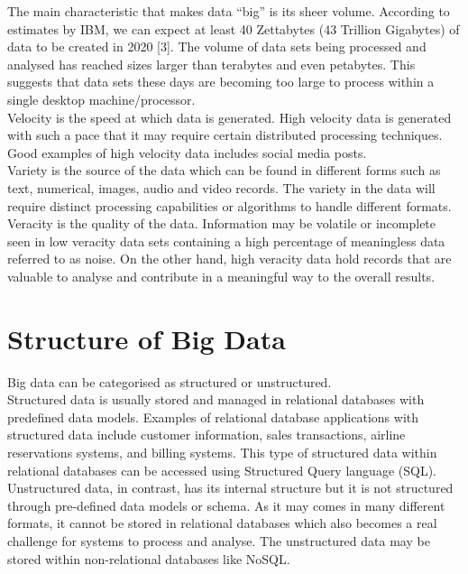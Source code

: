 \documentclass[11pt]{book}
\begin{document}
The main characteristic that makes data “big” is its sheer volume. According to estimates by IBM, we can expect at least 40 Zettabytes (43 Trillion Gigabytes) of data to be created in 2020 [3]. The volume of data sets being processed and analysed has reached sizes larger than terabytes and even petabytes. This suggests that data sets these days are becoming too large to process within a single desktop machine/processor. \\

Velocity is the speed at which data is generated. High velocity data is generated with such a pace that it may require certain distributed processing techniques. Good examples of high velocity data includes social media posts.\\

Variety is the source of the data which can be found in different forms such as text, numerical, images, audio and video records. The variety in the data will require distinct processing capabilities or algorithms to handle different formats. \\

Veracity is the quality of the data. Information may be volatile or incomplete seen in low veracity data sets containing a high percentage of meaningless data referred to as noise. On the other hand, high veracity data hold records that are valuable to analyse and contribute in a meaningful way to the overall results.

\section{Structure of Big Data} 

Big data can be categorised as structured or unstructured.\\
 
Structured data is usually stored and managed in relational databases with predefined data models. Examples of relational database applications with structured data include customer information, sales transactions, airline reservations systems, and billing systems. This type of structured data within relational databases can be accessed using Structured Query language (SQL).\\
 
Unstructured data, in contrast, has its internal structure but it is not structured through pre-defined data models or schema. As it may comes in many different formats, it cannot be stored in relational databases which also becomes a real challenge for systems to process and analyse. The unstructured data may be stored within non-relational databases like NoSQL.
\end{document}
